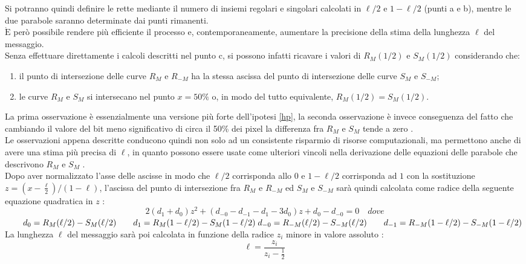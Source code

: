 Si potranno quindi definire le rette mediante il numero di insiemi regolari e singolari calcolati in $\ell /2$ e $1-\ell /2$ (punti a e b), mentre le due parabole saranno determinate dai punti rimanenti.\\$\mathrm{\grave{E}}$ però possibile rendere più efficiente il processo e, contemporaneamente, aumentare la precisione della stima della lunghezza $\ell$ del messaggio.\\ Senza effettuare direttamente i calcoli descritti nel punto c, si possono infatti ricavare i valori di $R_{M}(1/2)$ e $S_{M}(1/2)$ considerando che:
\begin{enumerate}
\item il punto di intersezione delle curve $R_{M}$ e $R_{-M}$ ha la stessa ascissa del punto di intersezione delle curve $S_{M}$ e $S_{-M}$;
\item le curve $R_{M}$ e $S_{M}$ si intersecano nel punto $x=50\%$ o, in modo del tutto equivalente, $R_{M}(1/2)=S_{M}(1/2)$.
\end{enumerate} 
La prima osservazione è essenzialmente una versione più forte dell'ipotesi \ref{hp}, la seconda osservazione è invece conseguenza del fatto che cambiando il valore del bit meno significativo di circa il 50\% dei pixel la differenza fra $R_{M}$ e $S_{M}$ tende a zero \cite{fried1, fried2, seeingTheUnseen, warfare}.\\
Le osservazioni appena descritte conducono quindi non solo ad un consistente risparmio di risorse computazionali, ma permettono anche di avere una stima più precisa di $\ell$, in quanto possono essere usate come ulteriori vincoli nella derivazione delle equazioni delle parabole che descrivono $R_{M}$ e $S_{M}$ \cite{fried1}.\\Dopo aver normalizzato l'asse delle ascisse in modo che $\ell/2$ corrisponda allo $0$ e $1-\ell/2$ corrisponda ad $1$ con la sostituzione $z= (x-\frac{\ell}{2})/(1-\ell)$, l'ascissa del punto di intersezione fra $R_{M}$ e $R_{-M}$ ed $S_{M}$ e $S_{-M}$ sarà quindi calcolata come radice della seguente equazione quadratica in $z$ \cite{fried1, fried2, improved}:
\[2(d_1+d_0)z^2 + (d_{-0}-d_{-1}-d_{1}-3d_{0})z + d_{0} - d_{-0} = 0 \quad \mathit{dove}\]
$\qquad d_{0}=R_{M}(\ell /2)-S_{M}(\ell /2)\qquad d_{1}=R_{M}(1-\ell /2)-S_{M}(1-\ell /2)\\
\; d_{-0}=R_{-M}(\ell /2)-S_{-M}(\ell /2)\qquad d_{-1}=R_{-M}(1-\ell /2)-S_{-M}(1-\ell /2)$\vspace{0.4cm}\\
La lunghezza $\ell$ del messaggio sarà poi calcolata in funzione della radice $z_i$ minore in valore assoluto \cite{fried1}:
\[\ell = \frac{z_i}{z_i -\frac{1}{2}}\]
